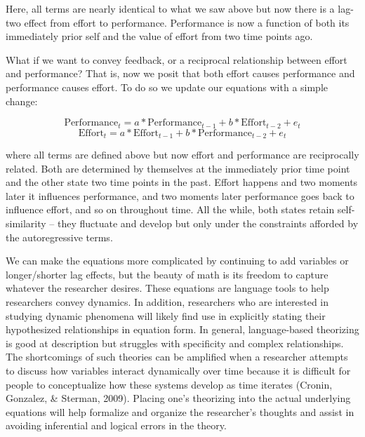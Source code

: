 \documentclass[english,,man]{apa6}
\begin{document}
\noindent Here, all terms are nearly identical to what we saw above but now there is a lag-two effect from effort to performance. Performance is now a function of both its immediately prior self and the value of effort from two time points ago.

What if we want to convey feedback, or a reciprocal relationship between effort and performance? That is, now we posit that both effort causes performance and performance causes effort. To do so we update our equations with a simple change:

\begin{equation}
\label{sysy3}
\textrm{Performance}_{t} = a * \textrm{Performance}_{t - 1} + b * \textrm{Effort}_{t - 2} + e_{t}
\end{equation}
\begin{equation}
\label{sysx3}
\textrm{Effort}_{t} = a * \textrm{Effort}_{t - 1} + b * \textrm{Performance}_{t - 2} + e_{t}
\end{equation}

\noindent where all terms are defined above but now effort and performance are reciprocally related. Both are determined by themselves at the immediately prior time point and the other state two time points in the past. Effort happens and two moments later it influences performance, and two moments later performance goes back to influence effort, and so on throughout time. All the while, both states retain self-similarity -- they fluctuate and develop but only under the constraints afforded by the autoregressive terms.

We can make the equations more complicated by continuing to add variables or longer/shorter lag effects, but the beauty of math is its freedom to capture whatever the researcher desires. These equations are language tools to help researchers convey dynamics. In addition, researchers who are interested in studying dynamic phenomena will likely find use in explicitly stating their hypothesized relationships in equation form. In general, language-based theorizing is good at description but struggles with specificity and complex relationships. The shortcomings of such theories can be amplified when a researcher attempts to discuss how variables interact dynamically over time because it is difficult for people to conceptualize how these systems develop as time iterates (Cronin, Gonzalez, \& Sterman, 2009). Placing one's theorizing into the actual underlying equations will help formalize and organize the researcher's thoughts and assist in avoiding inferential and logical errors in the theory.
\end{document}
